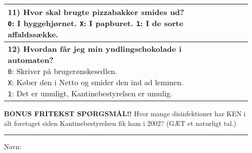 \begin{center}
\begin{tabular}{|p{12cm}|p{0.2cm}|p{0.2cm}|p{0.2cm}|}
\parbox{12cm}{
  \vspace{0.2cm}
  \textbf{11) Hvor skal brugte pizzabakker smides ud?} \\
  \texttt{0}: I hyggehjørnet. \quad
  \texttt{X}: I papburet. \quad
  \texttt{1}: I de sorte affaldssække.
  \vspace{0.1cm}
} & & & \\\hline
\parbox{12cm}{
  \vspace{0.2cm}
  \textbf{12) Hvordan får jeg min yndlingschokolade i automaten?} \\
  \texttt{0}: Skriver på brugerønskesedlen. \\
  \texttt{X}: Køber den i Netto og smider den ind ad lemmen. \\
  \texttt{1}: Det er umuligt, Kantinebestyrelsen er umulig.
  \vspace{0.1cm}
} & & & \\\hline
\end{tabular}

\vspace{0.5cm}

{\large\textbf{BONUS FRITEKST SPØRGSMÅL!!} Hvor mange disinfektioner har KEN i
alt foretaget siden Kantinebestyrelsen fik ham i 2002? (GÆT et naturligt tal.)
\\ \vspace{0.5cm} \rule{5cm}{0.4pt}}

\vspace{0.7cm}

{\large Navn: \hrulefill}

\end{center}

